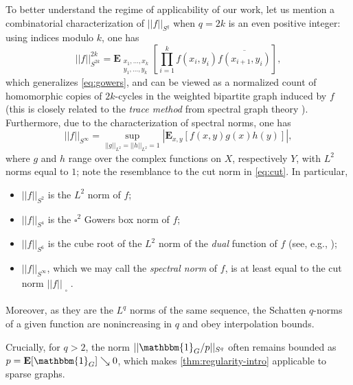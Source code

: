 \documentclass[reqno,11pt]{amsart}
\theoremstyle{definition}
\theoremstyle{remark}
\numberwithin{equation}{section}
\newcommand{\E}{\mathbf{E}}
\newcommand{\one}{\mathbbm{1}}
\renewcommand{\bar}{\overline}
\newcommand{\sq}{_{\substack{ \\ \square}}}
\newcommand{\gow}{_{\substack{ \\ \square^2}}}
\begin{document}
To better understand the regime of applicability of our work, let us mention a combinatorial characterization of $||f||_{S^q}$ when $q = 2k$ is an even positive integer: using indices modulo $k$, one has
\begin{equation} \label{eq:Schatten-2k}
    ||f||_{S^{2k}}^{2k} = \E_{\substack{x_1, \ldots, x_k \\ y_1, \ldots, y_k}} \left[\prod_{i=1}^k f(x_i, y_i) \bar{f(x_{i+1}, y_i)} \right],
\end{equation}
which generalizes \cref{eq:gowers}, and can be viewed as a normalized count of homomorphic copies of $2k$-cycles in the weighted bipartite graph induced by $f$ (this is closely related to the \emph{trace method} from spectral graph theory \cite{dsouza2013combinatorial,cioabua2006closed}). Furthermore, due to the characterization of spectral norms, one has
\begin{equation} \label{eq:Schatten-infty}
    ||f||_{S^\infty} = \sup_{||g||_{L^2} = ||h||_{L^2} = 1} \left\vert \E_{x,y} \left[f(x,y) g(x) h(y) \right] \right\vert,
\end{equation}
where $g$ and $h$ range over the complex functions on $X$, respectively $Y$, with $L^2$ norms equal to $1$; note the resemblance to the cut norm in \cref{eq:cut}. In particular,
\begin{itemize}
    \item[$(i)$.] $||f||_{S^2}$ is the $L^2$ norm of $f$;
    \item[$(ii)$.] $||f||_{S^4}$ is the $\square^2$ Gowers box norm of $f$;
    \item[$(iii)$.] $||f||_{S^6}$ is the cube root of the $L^2$ norm of the \emph{dual} function of $f$ (see, e.g., \cite{tao2007ergodic,tao2006gaussian});
    \item[$(iv)$.] $||f||_{S^\infty}$, which we may call the \emph{spectral norm} of $f$, is at least equal to the cut norm $||f||\sq$. %
\end{itemize}
Moreover, as they are the $L^q$ norms of the same sequence, the Schatten $q$-norms of a given function are nonincreasing in $q$ and obey interpolation bounds. 

Crucially, for $q > 2$, the norm $||\one_{G}/p||_{S^q}$ often remains bounded as $p = \E[\one_G] \searrow 0$, which makes \cref{thm:regularity-intro} applicable to sparse graphs. %
\end{document}
